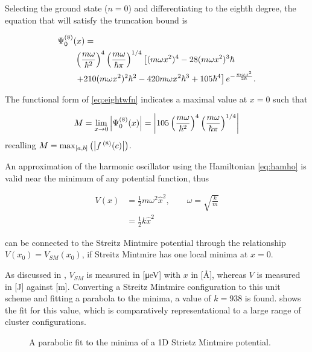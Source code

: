 Selecting the ground state ($n=0$) and differentiating to the eighth degree, the equation that will satisfy the truncation bound is

\begin{align}
\MoveEqLeft \Psi_0^{(8)}(x) = \nonumber\\
&\left(\frac{m\omega}{\hbar^2}\right)^4\left(\frac{m\omega}{\hbar\pi}\right)^{1/4}\left[(m\omega x^2)^4-28 (m\omega x^2)^3\hbar\right.\nonumber\\
&\left.+210(m\omega x^2)^2\hbar ^2-420m\omega x^2\hbar^3+105\hbar^4\right]e^{-\frac{m\omega x^2}{2\hbar}}.
\label{eq:eightwfn}
\end{align}

The functional form of \cref{eq:eightwfn} indicates a maximal value at $x=0$ such that

\begin{equation}
M = \lim_{x \to 0} \left\lvert \Psi_0^{(8)}(x)\right\rvert = \left\lvert 105\left(\frac{m\omega}{\hbar^2}\right)^4\left(\frac{m\omega}{\hbar\pi}\right)^{1/4}\right\rvert
\label{eq:Mlimit}
\end{equation}
recalling $M = \mathrm{max}_{[a,b]}\left(\left\lvert f\,^{(8)}(c)\right\rvert\right)$.

An approximation of the harmonic oscillator using the Hamiltonian \cref{eq:hamho} is valid near the minimum of any potential function, thus

\begin{align}
V(x) &= \frac{1}{2}m\omega^2\hat{x}^2, \qquad \omega=\sqrt{\frac{k}{m}}\label{eq:vharm}\\
     &= \frac{1}{2}k\hat{x}^2
\end{align}

can be connected to the Streitz Mintmire potential through the relationship $V(x_{0})=V_{SM}(x_{0})$, if Streitz Mintmire has one local minima at $x=0$.

As discussed in , $V_{SM}$ is measured in [μeV] with $x$ in [Å], whereas $V$ is measured in [J] against [m].
Converting a Streitz Mintmire configuration to this unit scheme and fitting a parabola to the minima, a value of $k=938$ is found.
 shows the fit for this value, which is comparatively representational to a large range of cluster configurations.

\begin{figure}[htp]
\centering
\hspace{-1cm}\resizebox{0.7\columnwidth}{!}{}
\caption[Harmonic Approximation to Strietz Mintmire]{\label{fig:harmsm}A parabolic fit to the minima of a 1D Strietz Mintmire potential.}
\end{figure}

